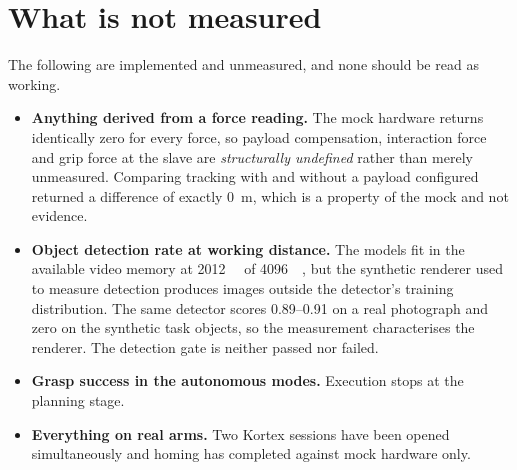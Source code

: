 \section{What is not measured}

The following are implemented and unmeasured, and none should be read as
working.

\begin{itemize}
  \item \textbf{Anything derived from a force reading.} The mock hardware
    returns identically zero for every force, so payload compensation,
    interaction force and grip force at the slave are \emph{structurally
    undefined} rather than merely unmeasured. Comparing tracking with and
    without a payload configured returned a difference of exactly
    \SI{0}{\metre}, which is a property of the mock and not evidence.
  \item \textbf{Object detection rate at working distance.} The models fit in
    the available video memory at \SI{2012}{\mebi\byte} of \SI{4096}{\mebi\byte},
    but the synthetic renderer used to measure detection produces images
    outside the detector's training distribution. The same detector scores
    \numrange{0.89}{0.91} on a real photograph and zero on the synthetic task
    objects, so the measurement characterises the renderer. The detection gate
    is neither passed nor failed.
  \item \textbf{Grasp success in the autonomous modes.} Execution stops at
    the planning stage.
  \item \textbf{Everything on real arms.} Two Kortex sessions have been opened
    simultaneously and homing has completed against mock hardware only.
\end{itemize}
